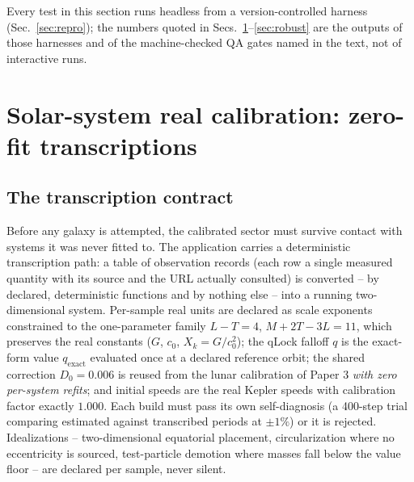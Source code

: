 \documentclass[aps,reprint,amsmath,amssymb,nofootinbib,superscriptaddress,floatfix]{revtex4-2}
\begin{document}
Every test in this section runs headless from a version-controlled
harness (Sec.~\ref{sec:repro}); the numbers quoted in
Secs.~\ref{sec:solar}--\ref{sec:robust} are the outputs of those
harnesses and of the machine-checked QA gates named in the text, not of
interactive runs.

\section{Solar-system real calibration: zero-fit transcriptions}
\label{sec:solar}

\subsection{The transcription contract}

Before any galaxy is attempted, the calibrated sector must survive
contact with systems it was never fitted to. The application carries a
deterministic transcription path: a table of observation records (each
row a single measured quantity with its source and the URL actually
consulted) is converted -- by declared, deterministic functions and by
nothing else -- into a running two-dimensional system. Per-sample real
units are declared as scale exponents constrained to the one-parameter
family $L-T=4$, $M+2T-3L=11$, which preserves the real constants
($G$, $c_0$, $X_k=G/c_0^2$); the qLock falloff $q$ is the exact-form
value $q_{\mathrm{exact}}$ evaluated once at a declared reference orbit;
the shared correction $D_0=0.006$ is reused from the lunar calibration
of Paper 3 \emph{with zero per-system refits}; and initial speeds are
the real Kepler speeds with calibration factor exactly $1.000$. Each
build must pass its own self-diagnosis (a 400-step trial comparing
estimated against transcribed periods at $\pm1\%$) or it is rejected.
Idealizations -- two-dimensional equatorial placement, circularization
where no eccentricity is sourced, test-particle demotion where masses
fall below the value floor -- are declared per sample, never silent.
\end{document}
